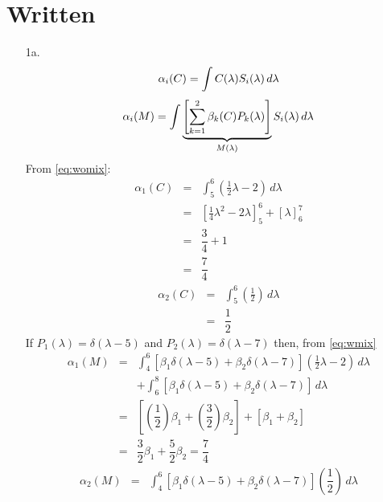 \documentclass[10pt, a4paper]{article}
\begin{document}

\section{Written}
\begin{enumerate}
  \item[1a. ]
    \begin{equation} \label{eq:womix}
      \alpha_i(C) = \int C(\lambda) S_{i}(\lambda)\, d\lambda \\
    \end{equation}
    \begin{equation} \label{eq:wmix}
      \alpha_i(M) = \int \underbrace{\left[\sum_{k=1}^{2}\beta_{k}(C)P_{k}(\lambda) \right]}_{M(\lambda)}S_i(\lambda)\, d\lambda \\
    \end{equation}
    From \eqref{eq:womix}:
    \begin{eqnarray}
      \alpha_1(C) &=& \int^{6}_{5} \left( \frac{1}{2}\lambda -2 \right) \, d\lambda \\
      &=& \left[\frac{1}{4}\lambda^{2} - 2\lambda \right]^{6}_{5} + \left[\lambda \right]^{7}_{6} \\
      &=& \dfrac{3}{4} + 1 \\
      &=& \dfrac{7}{4}
    \end{eqnarray}
    \begin{eqnarray}
      \alpha_2(C) &=& \int^6_5 \left(\frac{1}{2}\right) \, d\lambda \\
      &=& \dfrac{1}{2}
    \end{eqnarray}
    If
    $P_1(\lambda) = \delta (\lambda-5)$
    and
    $P_2(\lambda) = \delta (\lambda-7)$
    then, from \eqref{eq:wmix}
    \begin{eqnarray}
      \alpha_1(M) &=& \int^6_4 \left[\beta_1\delta(\lambda-5) + \beta_2\delta(\lambda-7)\right]\left(\frac{1}{2}\lambda-2\right)\,
      d\lambda \\
      && + \int^8_6\left[\beta_1\delta(\lambda-5) + \beta_2\delta(\lambda-7)\right]\,d\lambda \nonumber \\
      &=& \left[\left(\dfrac{1}{2}\right)\beta_1 + \left(\dfrac{3}{2}\right)\beta_2\right] + \left[\beta_1 + \beta_2 \right] \\
      &=& \dfrac{3}{2}\beta_1 + \dfrac{5}{2}\beta_2 = \dfrac{7}{4}
    \end{eqnarray}
    \begin{eqnarray}
      \alpha_2(M) &=& \int^6_4\left[\beta_1\delta(\lambda-5) + \beta_2\delta(\lambda-7)\right]\left(\dfrac{1}{2}\right)\,d\lambda \\

\end{eqnarray}
\end{enumerate}
\end{document}
